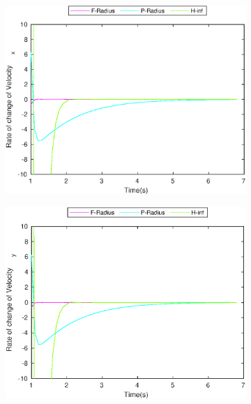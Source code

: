 \begin{figure}[!h]
\begin{subfigure}{.5\linewidth}
\end{subfigure}
\begin{subfigure}{.5\linewidth}
\centering
\includegraphics[width=.9\linewidth]{figures/BoundChange/CS/cs_bound_changeVelocity_x}
\end{subfigure}
\begin{subfigure}{.5\linewidth}
\centering
\includegraphics[width=.9\linewidth]{figures/BoundChange/CS/cs_bound_changeVelocity_y}
\end{subfigure}
\begin{subfigure}{.5\linewidth}
\centering

\end{subfigure}
\end{figure}
